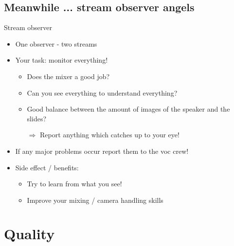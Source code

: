 \documentclass[hyperref={pdfpagelabels=false},aspectratio=169]{beamer}
\begin{document}
\subsection{Meanwhile ... stream observer angels} %
\begin{frame}{Stream observer}
\begin{itemize}
\item One observer - two streams 
\item Your task: monitor everything!
	\begin{itemize}
	\item Does the mixer a good job?
	\item  Can you see everything to understand everything?
	\item Good balance between the amount of images of the speaker and the slides?
	\item[$\Rightarrow$] Report anything which catches up to your eye!
	\end{itemize}
\item If any major problems occur report them to the voc crew!
\item Side effect / benefits:
	\begin{itemize}
	\item Try to learn from what you see!
	\item Improve your mixing / camera handling skills
	\end{itemize}
\end{itemize} 
\end{frame}


\section{Quality}  %
\end{document}
